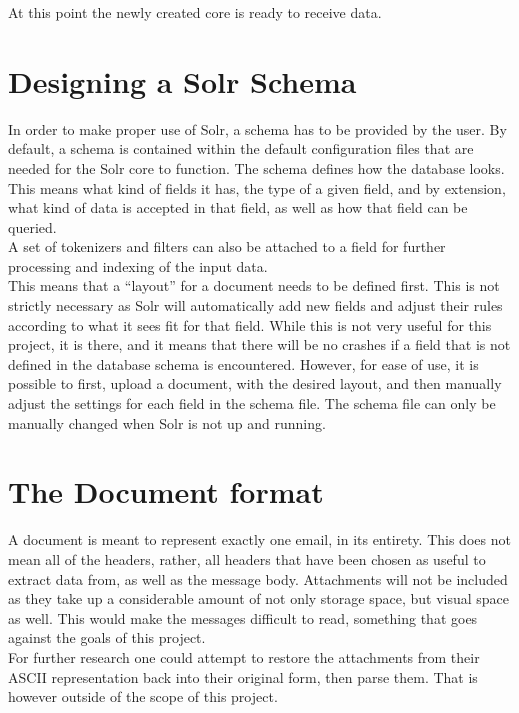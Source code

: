 \documentclass[a4paper,english]{report}
\begin{document}
At this point the newly created core is ready to receive data.\\

\section{Designing a Solr Schema}

In order to make proper use of Solr, a schema has to be provided by the user. By default, a schema is contained within the default configuration files that are needed for the Solr core to function. The schema defines how the database looks. This means what kind of fields it has, the type of a given field, and by extension, what kind of data is accepted in that field, as well as how that field can be queried.\\
A set of tokenizers and filters can also be attached to a field for further processing and indexing of the input data. \\

This means that a “layout” for a document needs to be defined first. This is not strictly necessary as Solr will automatically add new fields and adjust their rules according to what it sees fit for that field. While this is not very useful for this project, it is there, and it means that there will be no crashes if a field that is not defined in the database schema is encountered. However, for ease of use, it is possible to first, upload a document, with the desired layout, and then manually adjust the settings for each field in the schema file. The schema file can only be manually changed when Solr is not up and running.





\section{The Document format}

A document is meant to represent exactly one email, in its entirety. This does not mean all of the headers, rather, all headers that have been chosen as useful to extract data from, as well as the message body. Attachments will not be included as they take up a considerable amount of not only storage space, but visual space as well. This would make the messages difficult to read, something that goes against the goals of this project. \\

For further research one could attempt to restore the attachments from their ASCII representation back into their original form, then parse them. That is however outside of the scope of this project.\\
\end{document}
